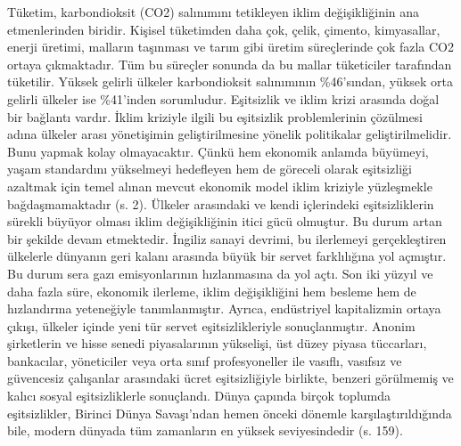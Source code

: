 \documentclass[
]{book}
\begin{document}
Tüketim, karbondioksit (CO2) salınımını tetikleyen iklim değişikliğinin ana etmenlerinden biridir. Kişisel tüketimden daha çok, çelik, çimento, kimyasallar, enerji üretimi, malların taşınması ve tarım gibi üretim süreçlerinde çok fazla CO2 ortaya çıkmaktadır. Tüm bu süreçler sonunda da bu mallar tüketiciler tarafından tüketilir. Yüksek gelirli ülkeler karbondioksit salınımının \%46'sından, yüksek orta gelirli ülkeler ise \%41'inden sorumludur. Eşitsizlik ve iklim krizi arasında doğal bir bağlantı vardır. İklim kriziyle ilgili bu eşitsizlik problemlerinin çözülmesi adına ülkeler arası yönetişimin geliştirilmesine yönelik politikalar geliştirilmelidir. Bunu yapmak kolay olmayacaktır. Çünkü hem ekonomik anlamda büyümeyi, yaşam standardını yükselmeyi hedefleyen hem de göreceli olarak eşitsizliği azaltmak için temel alınan mevcut ekonomik model iklim kriziyle yüzleşmekle bağdaşmamaktadır (s. 2). \citep{byrne2021}
Ülkeler arasındaki ve kendi içlerindeki eşitsizliklerin sürekli büyüyor olması iklim değişikliğinin itici gücü olmuştur. Bu durum artan bir şekilde devam etmektedir. İngiliz sanayi devrimi, bu ilerlemeyi gerçekleştiren ülkelerle dünyanın geri kalanı arasında büyük bir servet farklılığına yol açmıştır. Bu durum sera gazı emisyonlarının hızlanmasına da yol açtı. Son iki yüzyıl ve daha fazla süre, ekonomik ilerleme, iklim değişikliğini hem besleme hem de hızlandırma yeteneğiyle tanımlanmıştır. Ayrıca, endüstriyel kapitalizmin ortaya çıkışı, ülkeler içinde yeni tür servet eşitsizlikleriyle sonuçlanmıştır. Anonim şirketlerin ve hisse senedi piyasalarının yükselişi, üst düzey piyasa tüccarları, bankacılar, yöneticiler veya orta sınıf profesyoneller ile vasıflı, vasıfsız ve güvencesiz çalışanlar arasındaki ücret eşitsizliğiyle birlikte, benzeri görülmemiş ve kalıcı sosyal eşitsizliklerle sonuçlandı. Dünya çapında birçok toplumda eşitsizlikler, Birinci Dünya Savaşı'ndan hemen önceki dönemle karşılaştırıldığında bile, modern dünyada tüm zamanların en yüksek seviyesindedir (s. 159). \citep{harvey2016climate}
\end{document}
